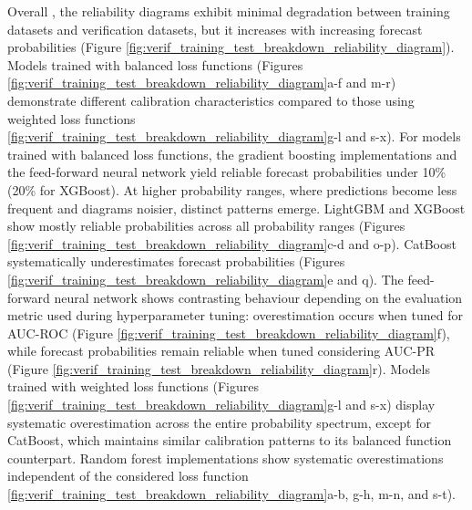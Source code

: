 Overall , the reliability diagrams exhibit minimal degradation between \textcolor{colourTraining}{training datasets} and \textcolor{colourTest}{verification datasets}, but it increases with increasing forecast probabilities (Figure \ref{fig:verif_training_test_breakdown_reliability_diagram}). Models trained with balanced loss functions (Figures \ref{fig:verif_training_test_breakdown_reliability_diagram}a-f and m-r) demonstrate different calibration characteristics compared to those using weighted loss functions \ref{fig:verif_training_test_breakdown_reliability_diagram}g-l and s-x). For models trained with balanced loss functions, the gradient boosting implementations and the feed-forward neural network yield reliable forecast probabilities under 10\% (20\% for XGBoost). At higher probability ranges, where predictions become less frequent and diagrams noisier, distinct patterns emerge. LightGBM and XGBoost show mostly reliable probabilities across all probability ranges (Figures \ref{fig:verif_training_test_breakdown_reliability_diagram}c-d and o-p). CatBoost systematically underestimates forecast probabilities (Figures \ref{fig:verif_training_test_breakdown_reliability_diagram}e and q). The feed-forward neural network shows contrasting behaviour depending on the evaluation metric used during hyperparameter tuning: overestimation occurs when tuned for AUC-ROC (Figure \ref{fig:verif_training_test_breakdown_reliability_diagram}f), while forecast probabilities remain reliable when tuned considering AUC-PR (Figure \ref{fig:verif_training_test_breakdown_reliability_diagram}r). Models trained with weighted loss functions (Figures \ref{fig:verif_training_test_breakdown_reliability_diagram}g-l and s-x) display systematic overestimation across the entire probability spectrum, except for CatBoost, which maintains similar calibration patterns to its balanced function counterpart. Random forest implementations show systematic overestimations independent of the considered loss function \ref{fig:verif_training_test_breakdown_reliability_diagram}a-b, g-h, m-n, and s-t).

